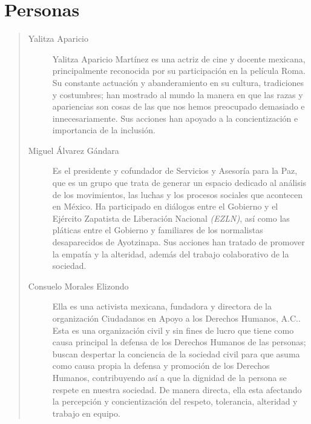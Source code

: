 \documentclass[12pt]{article}
\begin{document}
\section*{Personas} 
	\begin{quote}\begin{description}
		\item [Yalitza Aparicio] Yalitza Aparicio Martínez es una actriz de cine y docente mexicana, principalmente reconocida por su participación en la película Roma. Su constante actuación y abanderamiento en su cultura, tradiciones y costumbres; han mostrado al mundo la manera en que las razas y apariencias son cosas de las que nos hemos preocupado demasiado e innecesariamente. Sus acciones han apoyado a la concientización e importancia de la inclusión. 
		\ \\
		\item [Miguel Álvarez Gándara] Es el presidente y cofundador de Servicios y Asesoría para la Paz, que es un grupo que trata de generar un espacio dedicado al análisis de los movimientos, las luchas y los procesos sociales que acontecen en México. Ha participado en diálogos entre el Gobierno y el Ejército Zapatista de Liberación Nacional \textit{(EZLN)}, así como las pláticas entre el Gobierno y familiares de los normalistas desaparecidos de Ayotzinapa. Sus acciones han tratado de promover la empatía y la alteridad, además del trabajo colaborativo de la sociedad.
		\ \\
		\item [Consuelo Morales Elizondo] Ella es una activista mexicana, fundadora y directora de la organización Ciudadanos en Apoyo a los Derechos Humanos, A.C.. Esta es una organización civil y sin fines de lucro que tiene como causa principal la defensa de los Derechos Humanos de las personas; buscan despertar la conciencia de la sociedad civil para que asuma como causa propia la defensa y promoción de los Derechos Humanos, contribuyendo así a que la dignidad de la persona se respete en nuestra sociedad. De manera directa, ella esta afectando la percepción y concientización del respeto, tolerancia, alteridad y trabajo en equipo.

	\end{description}\end{quote}

 
\end{document}
